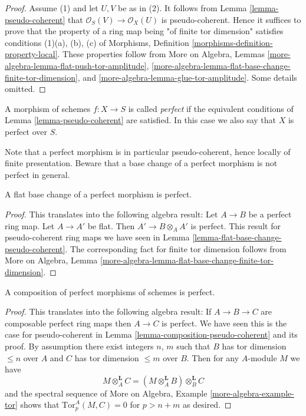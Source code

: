 \begin{proof}
Assume (1) and let $U, V$ be as in (2).
It follows from
Lemma \ref{lemma-pseudo-coherent}
that $\mathcal{O}_S(V) \to \mathcal{O}_X(U)$ is pseudo-coherent.
Hence it suffices to prove that the property of a ring map
being "of finite tor dimension" satisfies
conditions (1)(a), (b), (c) of
Morphisms, Definition \ref{morphisms-definition-property-local}.
These properties follow from
More on Algebra,
Lemmas \ref{more-algebra-lemma-flat-push-tor-amplitude},
\ref{more-algebra-lemma-flat-base-change-finite-tor-dimension}, and
\ref{more-algebra-lemma-glue-tor-amplitude}.
Some details omitted.
\end{proof}

\begin{definition}
\label{definition-perfect}
A morphism of schemes $f : X \to S$ is called {\it perfect}
if the equivalent conditions of
Lemma \ref{lemma-pseudo-coherent}
are satisfied. In this case we also say that $X$ is perfect
over $S$.
\end{definition}

\noindent
Note that a perfect morphism is in particular pseudo-coherent, hence
locally of finite presentation. Beware that a base change of a perfect
morphism is not perfect in general.

\begin{lemma}
\label{lemma-flat-base-change-perfect}
A flat base change of a perfect morphism is perfect.
\end{lemma}

\begin{proof}
This translates into the following algebra result:
Let $A \to B$ be a perfect ring map.
Let $A \to A'$ be flat. Then $A' \to B \otimes_A A'$ is
perfect. This result for pseudo-coherent ring maps we have seen in
Lemma \ref{lemma-flat-base-change-pseudo-coherent}.
The corresponding fact for finite tor dimension follows from
More on Algebra,
Lemma \ref{more-algebra-lemma-flat-base-change-finite-tor-dimension}.
\end{proof}

\begin{lemma}
\label{lemma-composition-perfect}
A composition of perfect morphisms of schemes is perfect.
\end{lemma}

\begin{proof}
This translates into the following algebra result:
If $A \to B \to C$ are composable perfect ring maps
then $A \to C$ is perfect. We have seen this is the case for
pseudo-coherent in
Lemma \ref{lemma-composition-pseudo-coherent}
and its proof. By assumption there exist integers $n$, $m$ such
that $B$ has tor dimension $\leq n$ over $A$ and $C$ has tor dimension
$\leq m$ over $B$. Then for any $A$-module $M$ we have
$$
M \otimes_A^{\mathbf{L}} C =
(M \otimes_A^{\mathbf{L}} B) \otimes_B^{\mathbf{L}} C
$$
and the spectral sequence of
More on Algebra, Example \ref{more-algebra-example-tor}
shows that $\text{Tor}^A_p(M, C) = 0$ for $p > n + m$ as desired.
\end{proof}

